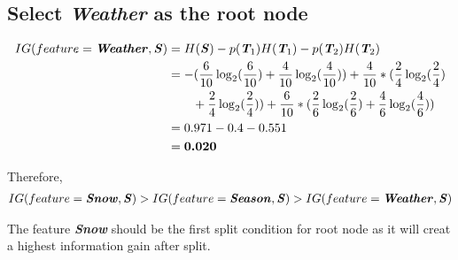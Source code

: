\documentclass{article}
\begin{document}
\subsection*{Select \textbf{\textit{Weather}} as the root node}
\begin{align*}
    IG(feature = \textbf{\textit{Weather}}, \textbf{\textit{S}}) &= H(\textbf{\textit{S}}) - p(\textbf{\textit{T$_1$}})H(\textbf{\textit{T$_1$}}) - p(\textbf{\textit{T$_2$}})H(\textbf{\textit{T$_2$}}) \\
    &= -(\frac{6}{10}\log_2(\frac{6}{10})+\frac{4}{10}\log_2(\frac{4}{10})) + \frac{4}{10}*(\frac{2}{4}\log_2(\frac{2}{4}) \nonumber \\
    & \qquad +\frac{2}{4}\log_2(\frac{2}{4})) + \frac{6}{10}*(\frac{2}{6}\log_2(\frac{2}{6})+\frac{4}{6}\log_2(\frac{4}{6})) \\
    &= 0.971 - 0.4 - 0.551 \\
    &= \textbf{0.020}
\end{align*} 

\noindent Therefore,
\begin{align*}
    IG(feature = \textbf{\textit{Snow}}, \textbf{\textit{S}}) > IG(feature = \textbf{\textit{Season}}, \textbf{\textit{S}}) > IG(feature = \textbf{\textit{Weather}}, \textbf{\textit{S}})
\end{align*} 

\noindent The feature \textbf{\textit{Snow}} should be the first split condition for root node as it will creat a highest information gain after split.
\end{document}

